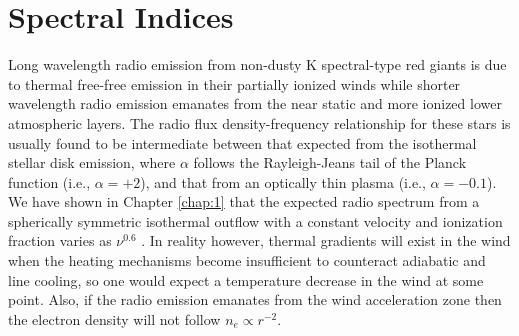 \section{Spectral Indices}
\label{sec:6.6}
Long wavelength radio emission from non-dusty K spectral-type red giants is due to thermal free-free emission in their partially ionized winds while shorter wavelength radio emission emanates from the near static and more ionized lower atmospheric layers. The radio flux density-frequency relationship for these stars is usually found to be intermediate between that expected from the isothermal stellar disk emission, where $\alpha$ follows the Rayleigh-Jeans tail of the Planck function (i.e., $\alpha = +2$), and that from an optically thin plasma (i.e., $\alpha = -0.1$). We have shown in Chapter \ref{chap:1} that the expected radio spectrum from a spherically symmetric isothermal outflow with a constant velocity and ionization fraction varies as $\nu ^{0.6}$ \citep{wright_1975,olnon_1975,panagia_1975}. In reality however, thermal gradients will exist in the wind when the heating mechanisms become insufficient to counteract adiabatic and line cooling, so one would expect a temperature decrease in the wind at some point. Also, if the radio emission emanates from the wind acceleration zone then the electron density will not follow $n_{e} \propto r^{-2}$. 

